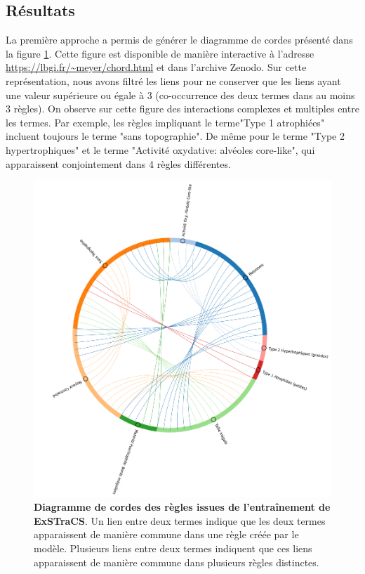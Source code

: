 \subsection{Résultats}
La première approche a permis de générer le diagramme de cordes présenté dans la figure \ref{fig:chords}. Cette figure est disponible de manière interactive à l'adresse \url{https://lbgi.fr/~meyer/chord.html} et dans l'archive Zenodo. Sur cette représentation, nous avons filtré les liens pour ne conserver que les liens ayant une valeur supérieure ou égale à 3 (co-occurrence des deux termes dans au moins 3 règles). On observe sur cette figure des interactions complexes et multiples entre les termes. Par exemple, les règles impliquant le terme"Type 1 atrophiées" incluent toujours le terme "sans topographie". De même pour le terme "Type 2 hypertrophiques" et le terme "Activité oxydative: alvéoles core-like", qui apparaissent conjointement dans 4 règles différentes. \clearpage
\begin{figure}[H]
  \centering
  \includegraphics[width=1\textwidth]{figures/chord_plot.png}
  \caption[Diagramme de cordes des règles issues de l'entrainement de ExSTraCS]{\textbf{Diagramme de cordes des règles issues de l'entraînement de ExSTraCS}. Un lien entre deux termes indique que les deux termes apparaissent de manière commune dans une règle créée par le modèle. Plusieurs liens entre deux termes indiquent que ces liens apparaissent de manière commune dans plusieurs règles distinctes.}
  \label{fig:chords}
\end{figure}

